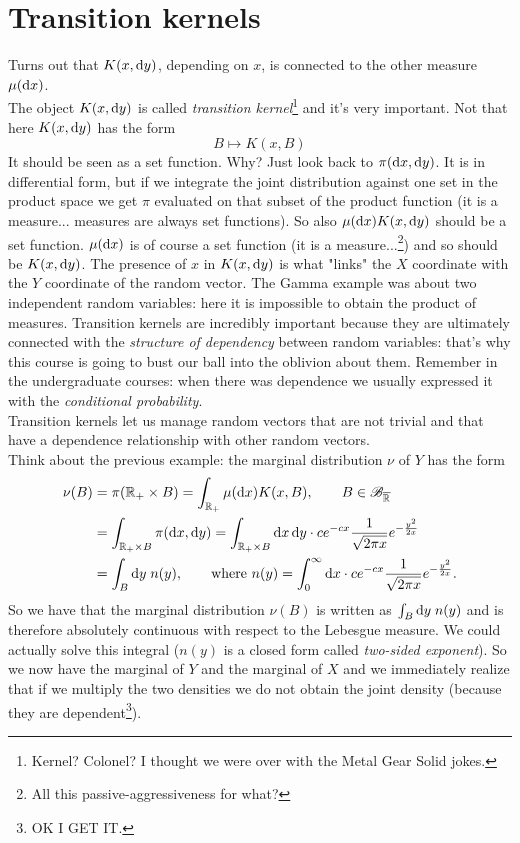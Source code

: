 \documentclass{report}
\begin{document}
\section{Transition kernels}
Turns out that $K(x,\mathop{}\!\mathrm{d} y)$, depending on $x$, is connected to the other measure $\mu(\mathop{}\!\mathrm{d} x)$. \\
The object $K(x,\mathop{}\!\mathrm{d} y)$ is called \emph{transition kernel}\footnote{Kernel? Colonel? I thought we were over with the Metal Gear Solid jokes.} and it's very important. Not that here 
$K(x,\mathop{}\!\mathrm{d} y)$ has the form 	
\[B\mapsto K(x,B)\]
It should be seen as a set function. Why? Just look back to $\pi(\mathop{}\!\mathrm{d} x,\mathop{}\!\mathrm{d} y)$. It is in differential form, but if we integrate the joint distribution against one set in the product space we get $\pi$ evaluated on that subset of the product function (it is a measure... measures are always set functions). So also $\mu(\mathop{}\!\mathrm{d} x)K(x,\mathop{}\!\mathrm{d} y)$ should be a set function. $\mu(\mathop{}\!\mathrm{d} x)$ is of course a set function (it is a measure...\footnote{All this passive-aggressiveness for what?}) and so should be $K(x,\mathop{}\!\mathrm{d} y)$. The presence of $x$ in $K(x,\mathop{}\!\mathrm{d} y)$ is what "links" the $X$ coordinate with the $Y$ coordinate of the random vector.
The Gamma example was about two independent random variables: here it is impossible to obtain the product of measures. Transition kernels are incredibly important because they are ultimately connected with the \textit{structure of dependency} between random variables: that's why this course is going to bust our ball into the oblivion about them.
Remember in the undergraduate courses: when there was dependence we usually expressed it with the \textit{conditional probability}. \\
Transition kernels let us manage random vectors that are not trivial and that have a dependence relationship with other random vectors. \\
Think about the previous example: the marginal distribution $\nu$ of $Y$ has the form \begin{align*}
	\nu(B)&=\pi(\mathbb{R}_+\times B)=\int_{\mathbb{R}_+}\mu(\mathop{}\!\mathrm{d} x)K(x,B),\qquad B\in\mathscr{B}_{\overline{\mathbb{R}}}\\
	&=\int_{\mathbb{R}_+\times B}\pi(\mathop{}\!\mathrm{d} x,\mathop{}\!\mathrm{d} y)=\int_{\mathbb{R}_+\times B}\mathop{}\!\mathrm{d} x\mathop{}\!\mathrm{d} y\cdot ce^{-cx}\frac{1}{\sqrt{2\pi x}}e^{-\frac{y^2}{2x}}\\
	&=\int_B \mathop{}\!\mathrm{d} y\; n(y),\qquad\text{where }n(y)=\int_{0}^{\infty}\mathop{}\!\mathrm{d} x \cdot ce^{-cx}\frac{1}{\sqrt{2\pi x}}e^{-\frac{y^2}{2x}}.
\end{align*}
So we have that the marginal distribution $\nu(B)$ is written as $\int_B \mathop{}\!\mathrm{d} y\;n(y)$ and is therefore absolutely continuous with respect to the Lebesgue measure. We could actually solve this integral ($n(y)$ is a closed form called \textit{two-sided exponent}). So we now have the marginal of $Y$ and the marginal of $X$ and we immediately realize that if we multiply the two densities we do not obtain the joint density (because they are dependent\footnote{OK I GET IT.}).\par
\end{document}
